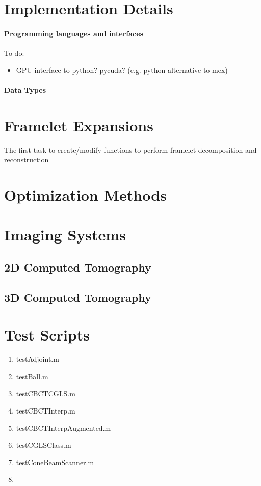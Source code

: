 \documentclass[12pt]{article}
\begin{document}
\section{Implementation Details}

\paragraph{Programming languages and interfaces}
To do: 
\begin{itemize}
\item GPU interface to python?  pycuda?  (e.g. python alternative to mex)
\end{itemize}

\paragraph{Data Types}



\section{Framelet Expansions}
The first task to create/modify functions to perform framelet decomposition and reconstruction 


\section{Optimization Methods}
%


\section{Imaging Systems}  
\subsection{2D Computed Tomography}


\subsection{3D Computed Tomography}

 
\section{Test Scripts}
\begin{enumerate}
\item testAdjoint.m
\item testBall.m
\item testCBCTCGLS.m 
\item testCBCTInterp.m
\item testCBCTInterpAugmented.m
\item testCGLSClass.m
\item testConeBeamScanner.m
\item 
\end{enumerate}
\end{document}
